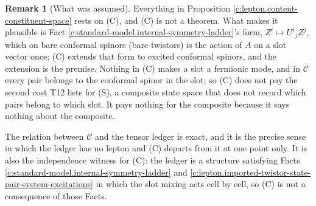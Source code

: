 \documentclass[11pt]{article}
\theoremstyle{definition}
\newtheorem{remark}[theorem]{Remark}
\theoremstyle{plain}
\providecommand{\Con}{}\renewcommand{\Con}{\mathcal{C}}
\begin{document}
\begin{remark}[What was assumed]\label{c:note.lepton.what-was-assumed}
Everything in Proposition \ref{c:lepton.content-constituent-space} rests on (C), and (C) is not a theorem. What makes it plausible is Fact \ref{c:standard-model.internal-symmetry-ladder}'s form, $Z^{i} \mapsto U^{i}{}_{j}Z^{j}$, which on bare conformal spinors (bare twistors) is the action of $A$ on a slot vector once; (C) extends that form to excited conformal spinors, and the extension is the premise. Nothing in (C) makes a slot a fermionic mode, and in $\Con$ every pair belongs to the conformal spinor in the slot; so (C) does not pay the second cost T12 lists for (S), a composite state space that does not record which pairs belong to which slot. It pays nothing for the composite because it says nothing about the composite.
\end{remark}

\label{c:note.lepton.setting-constituent-space-hypothesis-holds-lepton-2}
The relation between $\Con$ and the tensor ledger is exact, and it is the precise sense in which the ledger has no lepton and (C) departs from it at one point only. It is also the independence witness for (C): the ledger is a structure satisfying Facts \ref{c:standard-model.internal-symmetry-ladder} and \ref{c:lepton.imported-twistor-state-pair-system-excitations} in which the slot mixing acts cell by cell, so (C) is not a consequence of those Facts.
\end{document}
